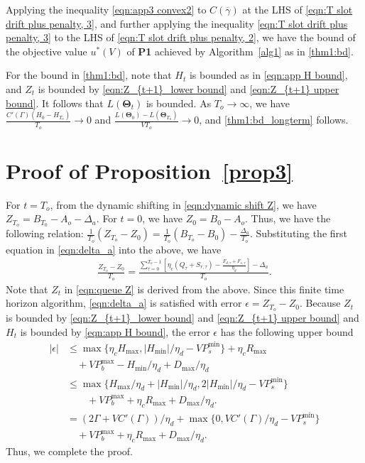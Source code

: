 \documentclass[journal]{IEEEtran}
\def\Thetabf{\boldsymbol \Theta}
\def\nn{\nonumber}
\begin{document}
Applying the inequality \eqref{eqn:app3 convex2} to $C(\overline{\gamma})$ at the LHS of \eqref{eqn:T slot drift plus penalty, 3}, and further applying the inequality \eqref{eqn:T slot drift plus penalty, 3} to the LHS of \eqref{eqn:T slot drift plus penalty, 2}, we have the  bound of the objective value $u^*(V)$ of {\bf P1} achieved by Algorithm~\ref{alg1}
as in \eqref{thm1:bd}.

For the bound in \eqref{thm1:bd}, note that $H_t$ is bounded as in \eqref{eqn:app H bound}, and $Z_t$ is bounded by \eqref{eqn:Z_{t+1}_lower bound} and \eqref{eqn:Z_{t+1} upper bound}. It follows that $L(\Thetabf_{t})$ is bounded. As $T_o\rightarrow\infty$, we have $\frac{C'(\Gamma)(H_{0}-H_{T_o})}{T_o}\rightarrow0$ and $\frac{L(\Thetabf_{0})-L(\Thetabf_{T_o})}{VT_o}\rightarrow0$, and  \eqref{thm1:bd_longterm} follows.
\endIEEEproof

\section{Proof of Proposition~\ref{prop3}}\label{appE}
\IEEEproof
For $t=T_o$, from the dynamic shifting in \eqref{eqn:dynamic shift Z}, we have $Z_{T_o}=B_{T_0}-A_o-\Delta_a$. For $t=0$, we have $Z_{0}=B_{0}-A_o$. Thus, we have the following relation: $\frac{1}{T_o}(Z_{T_o}-Z_{0})=\frac{1}{T_o}(B_{T_o}-B_{0})-\frac{\Delta_a}{T_o}$. Substituting the first equation in \eqref{eqn:delta_a} into the above, we have
\begin{align*}%
\frac{Z_{T_o}-Z_{0}}{T_o}=\frac{\sum_{\tau=0}^{T_o-1}[\eta_c(Q_\tau+S_{r,\tau})-\frac{F_{d,\tau}+F_{s,\tau}}{\eta_d}]-\Delta_a}{T_o}.
\end{align*}
Note that  $Z_t$ in \eqref{eqn:queue Z} is derived from  the above.
Since this finite time horizon algorithm, \eqref{eqn:delta_a} is satisfied with error $\epsilon=Z_{T_o}-Z_{0}$.
Because $Z_t$ is bounded by \eqref{eqn:Z_{t+1}_lower bound} and \eqref{eqn:Z_{t+1} upper bound} and $H_t$ is bounded by \eqref{eqn:app H bound}, the error $\epsilon$ has the following upper bound
\begin{align}
|\epsilon|%
&\leq \max\{\eta_cH_{\max},|H_{\min}|/\eta_d-VP_{s}^{\min}\}+\eta_cR_{\max}\nn\\
&\quad +VP_{b}^{\max}-H_{\min}/\eta_d+D_{\max}/\eta_d\nn\\
&\leq \max\{H_{\max}/\eta_d+|H_{\min}|/\eta_d, 2|H_{\min}|/\eta_d-VP_{s}^{\min}\}\nn\\
&\hspace{2em}+VP_{b}^{\max}+\eta_cR_{\max}+D_{\max}/\eta_d. \nn \\
&=(2\Gamma+VC'(\Gamma))/\eta_d+\max\{0,VC'(\Gamma)/\eta_d-VP_{s}^{\min}\}\nn \\
&\quad+VP_{b}^{\max}+\eta_cR_{\max}+D_{\max}/\eta_d.
\end{align}
Thus, we complete the proof.
\endIEEEproof
\end{document}
